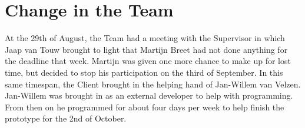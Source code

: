\section{Change in the Team}
\thispagestyle{fancy}
\label{sec:teamchange}
At the 29th of August, the Team had a meeting with the Supervisor in which Jaap van Touw brought to light that Martijn Breet had not done anything for the deadline that week. Martijn was given one more chance to make up for lost time, but decided to stop his participation on the third of September. In this same timespan, the Client brought in the helping hand of Jan-Willem van Velzen. Jan-Willem was brought in as an external developer to help with programming. From then on he programmed for about four days per week to help finish the prototype for the 2nd of October. 